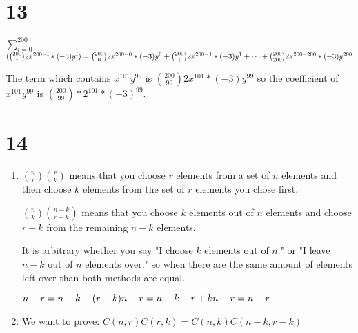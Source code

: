 \documentclass[12pt]{article}
\begin{document}
\section*{13}
$\sum_{i = 0}^{200}$$(\binom{200}{i} 2x^{200 - i} * (-3)y^i)\\
= \binom{200}{0} 2x^{200 - 0} * (-3)y^0 + \binom{200}{1} 2x^{200 - 1} * (-3)y^1 + \dots + \binom{200}{200} 2x^{200 - 200} * (-3)y^{200}$

The term which contains $x^{101}y^{99}$ is $\binom{200}{99} 2x^{101} * (-3)y^{99}$ so the coefficient of $x^{101}y^{99}$ is $\binom{200}{99} * 2^{101} * (-3)^{99}$.

\section*{14}
\begin{enumerate}[a]
	\item %
	$\binom{n}{r}\binom{r}{k}$ means that you choose $r$ elements from a set of $n$ elements and then choose $k$ elements from the set of $r$ elements you chose first.

	$\binom{n}{k}\binom{n - k}{r - k}$ means that you choose $k$ elements out of $n$ elements and choose $r - k$ from the remaining $n - k$ elements.

	It is arbitrary whether you say "I choose $k$ elements out of $n$." or "I leave $n - k$ out of $n$ elements over." so when there are the same amount of elements left over than both methods are equal.

	$n - r = n - k - (r - k)\\
	n - r = n - k - r + k\\
	n - r = n - r$ \checkmark

	\item %
	We want to prove: $C(n, r)C(r, k) = C(n, k)C(n - k, r - k)$


\end{enumerate}
\end{document}
